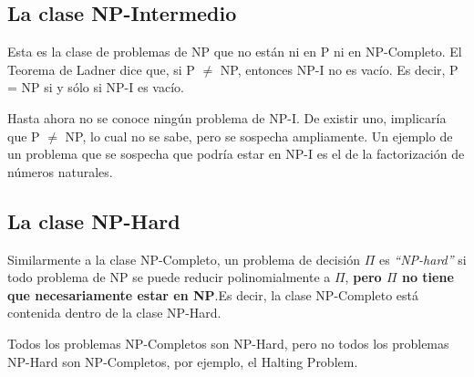\subsection{La clase NP-Intermedio}

Esta es la clase de problemas de NP que no est\'an ni en P ni en NP-Completo. El Teorema de Ladner dice que, si P $\neq$ NP, entonces NP-I no es vac\'io. Es decir, P = NP si y s\'olo si NP-I es vac\'io.

Hasta ahora no se conoce ning\'un problema de NP-I. De existir uno, implicar\'ia que P $\neq$ NP, lo cual no se sabe, pero se sospecha ampliamente. Un ejemplo de un problema que se sospecha que podr\'ia estar en NP-I es el de la factorizaci\'on de n\'umeros naturales.

\subsection{La clase NP-Hard}

Similarmente a la clase NP-Completo, un problema de decisi\'on $\Pi$ es \emph{``NP-hard''} si todo problema de NP se puede reducir polinomialmente a $\Pi$, \textbf{pero $\Pi$ no tiene que necesariamente estar en NP}.Es decir, la clase NP-Completo est\'a contenida dentro de la clase NP-Hard. 

Todos los problemas NP-Completos son NP-Hard, pero no todos los problemas NP-Hard son NP-Completos, por ejemplo, el Halting Problem.


